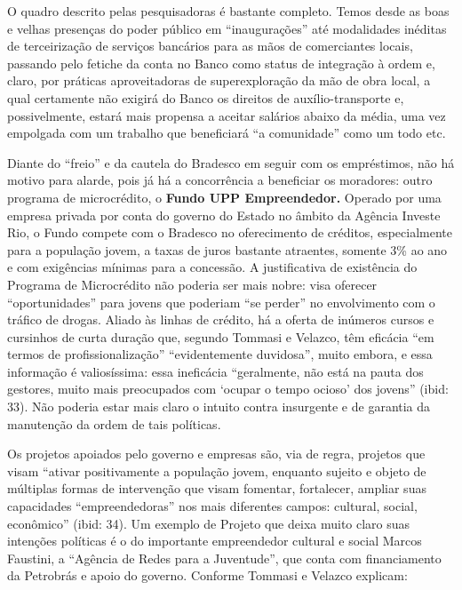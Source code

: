 O quadro descrito pelas pesquisadoras é bastante completo. Temos desde
as boas e velhas presenças do poder público em ``inaugurações'' até
modalidades inéditas de terceirização de serviços bancários para as mãos
de comerciantes locais, passando pelo fetiche da conta no Banco como
status de integração à ordem e, claro, por práticas aproveitadoras de
superexploração da mão de obra local, a qual certamente não exigirá do
Banco os direitos de auxílio-transporte e, possivelmente, estará mais
propensa a aceitar salários abaixo da média, uma vez empolgada com um
trabalho que beneficiará ``a comunidade'' como um todo etc.

Diante do ``freio'' e da cautela do Bradesco em seguir com os
empréstimos, não há motivo para alarde, pois já há a concorrência a
beneficiar os moradores: outro programa de microcrédito, o \textbf{Fundo
UPP Empreendedor.} Operado por uma empresa privada por conta do governo
do Estado no âmbito da Agência Investe Rio, o Fundo compete com o
Bradesco no oferecimento de créditos, especialmente para a população
jovem, a taxas de juros bastante atraentes, somente 3\% ao ano e com
exigências mínimas para a concessão. A justificativa de existência do
Programa de Microcrédito não poderia ser mais nobre: visa oferecer
``oportunidades'' para jovens que poderiam ``se perder'' no envolvimento
com o tráfico de drogas. Aliado às linhas de crédito, há a oferta de
inúmeros cursos e cursinhos de curta duração que, segundo Tommasi e
Velazco, têm eficácia ``em termos de profissionalização''
``evidentemente duvidosa'', muito embora, e essa informação é
valiosíssima: essa ineficácia ``geralmente, não está na pauta dos
gestores, muito mais preocupados com `ocupar o tempo ocioso' dos
jovens'' (ibid: 33). Não poderia estar mais claro o intuito contra
insurgente e de garantia da manutenção da ordem de tais políticas.

Os projetos apoiados pelo governo e empresas são, via de regra, projetos
que visam ``ativar positivamente a população jovem, enquanto sujeito e
objeto de múltiplas formas de intervenção que visam fomentar,
fortalecer, ampliar suas capacidades ``empreendedoras'' nos mais
diferentes campos: cultural, social, econômico'' (ibid: 34). Um exemplo
de Projeto que deixa muito claro suas intenções políticas é o do
importante empreendedor cultural e social Marcos Faustini, a ``Agência
de Redes para a Juventude'', que conta com financiamento da Petrobrás e
apoio do governo. Conforme Tommasi e Velazco explicam:


